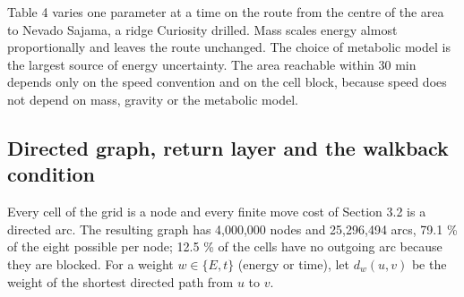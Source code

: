 \documentclass[11pt,a4paper]{article}
\begin{document}
Table 4 varies one parameter at a time on the route from the centre of the area to Nevado Sajama, a ridge Curiosity drilled. Mass scales energy almost proportionally and leaves the route unchanged. The choice of metabolic model is the largest source of energy uncertainty. The area reachable within 30 min depends only on the speed convention and on the cell block, because speed does not depend on mass, gravity or the metabolic model.

\begin{table}[H]
\centering\small
\caption{\textbf{Table 4. Sensitivity of the cost model.}}
\end{table}

\subsection{Directed graph, return layer and the walkback condition}

Every cell of the grid is a node and every finite move cost of Section 3.2 is a directed arc. The resulting graph has 4,000,000 nodes and 25,296,494 arcs, 79.1 \% of the eight possible per node; 12.5 \% of the cells have no outgoing arc because they are blocked. For a weight $w \in \{E, t\}$ (energy or time), let $d_w(u, v)$ be the weight of the shortest directed path from $u$ to $v$.
\end{document}
